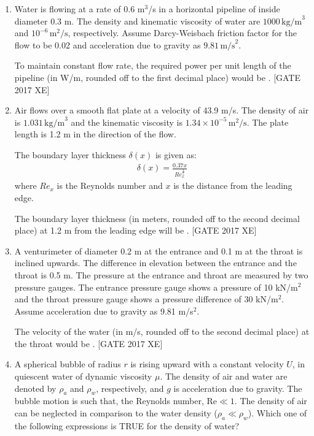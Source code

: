 \documentclass[journal,12pt,onecolumn]{IEEEtran}
\theoremstyle{remark}
\begin{document}
\begin{enumerate}
\item Water is flowing at a rate of 0.6 m$^3$/s in a horizontal pipeline of inside diameter 0.3 m.  
The density and kinematic viscosity of water are $1000 \,\text{kg/m}^3$ and $10^{-6} \,\text{m}^2/\text{s}$, respectively.  
Assume Darcy-Weisbach friction factor for the flow to be 0.02 and acceleration due to gravity as $9.81 \,\text{m/s}^2$.  

To maintain constant flow rate, the required power per unit length of the pipeline (in W/m, rounded off to the first decimal place) would be \underline{\hspace{2cm}}.  
\hfill [GATE 2017 XE]

\item Air flows over a smooth flat plate at a velocity of 43.9 m/s.  
The density of air is $1.031 \,\text{kg/m}^3$ and the kinematic viscosity is $1.34 \times 10^{-5} \,\text{m}^2/\text{s}$.  
The plate length is 1.2 m in the direction of the flow.  

The boundary layer thickness $\delta(x)$ is given as:  
\begin{align}
\delta(x) = \frac{0.37x}{Re_x^{\tfrac{1}{5}}}
\end{align}
where $Re_x$ is the Reynolds number and $x$ is the distance from the leading edge.  

The boundary layer thickness (in meters, rounded off to the second decimal place) at 1.2 m from the leading edge will be \underline{\hspace{2cm}}.  
\hfill [GATE 2017 XE]

\item A venturimeter of diameter 0.2 m at the entrance and 0.1 m at the throat is inclined upwards.  
The difference in elevation between the entrance and the throat is 0.5 m.  
The pressure at the entrance and throat are measured by two pressure gauges.  
The entrance pressure gauge shows a pressure of 10 kN/m$^2$ and the throat pressure gauge shows a pressure difference of 30 kN/m$^2$.  
Assume acceleration due to gravity as 9.81 m/s$^2$.  

The velocity of the water (in m/s, rounded off to the second decimal place) at the throat would be \underline{\hspace{2cm}}.  
\hfill [GATE 2017 XE]

\item A spherical bubble of radius $r$ is rising upward with a constant velocity $U$, in quiescent water of dynamic viscosity $\mu$. The density of air and water are denoted by $\rho_{a}$ and $\rho_{w}$, respectively, and $g$ is acceleration due to gravity. The bubble motion is such that, the Reynolds number, $\text{Re} \ll 1$. The density of air can be neglected in comparison to the water density ($\rho_{a} \ll \rho_{w}$). Which one of the following expressions is TRUE for the density of water?



\end{enumerate}
\end{document}
